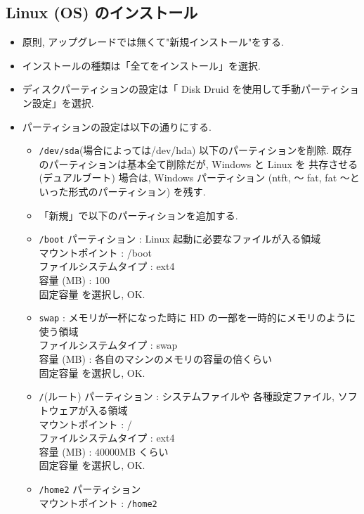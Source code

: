 \documentclass{jarticle}
\begin{document}
\subsection{Linux (OS) のインストール}
	\begin{itemize}
	\item 原則, アップグレードでは無くて"新規インストール"をする.
	\item インストールの種類は「全てをインストール」を選択.
	\item ディスクパーティションの設定は「 Disk Druid を使用して手動パーティション設定」を選択.
	\item パーティションの設定は以下の通りにする.
		\begin{itemize}
			\item \verb|/dev/sda|(場合によっては/dev/hda) 以下のパーティションを削除.
			      既存のパーティションは基本全て削除だが, Windows と Linux を
			      共存させる (デュアルブート) 場合は, Windows パーティション
			      (ntft, 〜 fat, fat 〜といった形式のパーティション) を残す.
			\item 「新規」で以下のパーティションを追加する.
			\item \verb|/boot| パーティション : Linux 起動に必要なファイルが入る領域 \\
			      マウントポイント : /boot \\
			      ファイルシステムタイプ : ext4 \\
			      容量 (MB) : 100 \\
			      固定容量 を選択し, OK.
			\item \verb|swap| : メモリが一杯になった時に
			      HD の一部を一時的にメモリのように使う領域 \\
			      ファイルシステムタイプ : swap \\
			      容量 (MB) : 各自のマシンのメモリの容量の倍くらい \\
			      固定容量 を選択し, OK.
			\item \verb|/|(ルート) パーティション : システムファイルや
			      各種設定ファイル, ソフトウェアが入る領域 \\
			      マウントポイント : / \\
			      ファイルシステムタイプ : ext4 \\
			      容量 (MB) : 40000MB くらい \\
			      固定容量 を選択し, OK. \\
			\item \verb|/home2| パーティション \\
			      マウントポイント : \verb|/home2| \\

\end{itemize}
\end{itemize}
\end{document}
